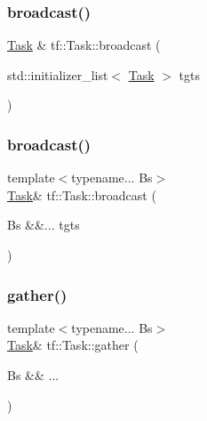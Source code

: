 \mbox{\label{classtf_1_1Task_af53724f41d3b6c7221645bd093d68189}} 
\subsubsection{\texorpdfstring{broadcast()}{broadcast()}\hspace{0.1cm}{\footnotesize\ttfamily [3/4]}}
{\footnotesize\ttfamily \hyperlink{classtf_1_1Task}{Task} \& tf\+::\+Task\+::broadcast (\begin{DoxyParamCaption}\item[{std\+::initializer\+\_\+list$<$ \hyperlink{classtf_1_1Task}{Task} $>$}]{tgts }\end{DoxyParamCaption})\hspace{0.3cm}{\ttfamily [inline]}}

\mbox{\label{classtf_1_1Task_a5ac7ac1f8f16dc4ec821fa19e36e25b1}} 
\subsubsection{\texorpdfstring{broadcast()}{broadcast()}\hspace{0.1cm}{\footnotesize\ttfamily [4/4]}}
{\footnotesize\ttfamily template$<$typename... Bs$>$ \\
\hyperlink{classtf_1_1Task}{Task}\& tf\+::\+Task\+::broadcast (\begin{DoxyParamCaption}\item[{Bs \&\&...}]{tgts }\end{DoxyParamCaption})}

\mbox{\label{classtf_1_1Task_aadd7845ba7867a87f1f2ac3f6d7ae569}} 
\subsubsection{\texorpdfstring{gather()}{gather()}\hspace{0.1cm}{\footnotesize\ttfamily [1/4]}}
{\footnotesize\ttfamily template$<$typename... Bs$>$ \\
\hyperlink{classtf_1_1Task}{Task}\& tf\+::\+Task\+::gather (\begin{DoxyParamCaption}\item[{Bs \&\&}]{... }\end{DoxyParamCaption})}

